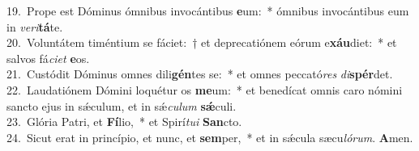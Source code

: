 {19.~}Prope est Dóminus ómnibus invocántibus \textbf{e}um:~* ómnibus invocántibus eum in \textit{ve}\textit{ri}\textbf{tá}te.\\
{20.~}Voluntátem timéntium se fáciet:~† et deprecatiónem eórum e\textbf{xáu}diet:~* et salvos fá\textit{ci}\textit{et} \textbf{e}os.\\
{21.~}Custódit Dóminus omnes dili\textbf{gén}tes se:~* et omnes peccató\textit{res} \textit{di}\textbf{spér}det.\\
{22.~}Laudatiónem Dómini loquétur os \textbf{me}um:~* et benedícat omnis caro nómini sancto ejus in sǽculum, et in sǽ\textit{cu}\textit{lum} \textbf{sǽ}culi.\\
{23.~}Glória Patri, et \textbf{Fí}lio,~* et Spirí\textit{tu}\textit{i} \textbf{San}cto.\\
{24.~}Sicut erat in princípio, et nunc, et \textbf{sem}per,~* et in sǽcula sæcu\textit{ló}\textit{rum}. \textbf{A}men.\\
